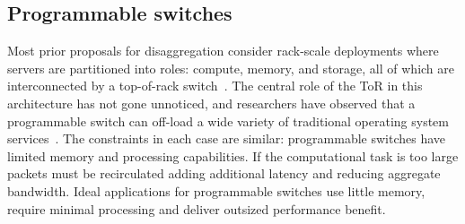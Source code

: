 







\subsection{Programmable switches}



Most prior proposals for
disaggregation consider rack-scale deployments where
servers are partitioned into roles: compute, memory, and storage, all
of which are interconnected by a top-of-rack
switch~\cite{disandapp,the-machine,intel-rack,firebox,legoos}.  The central
role of the ToR in this architecture has not gone unnoticed, and
researchers have observed that a programmable switch can off-load a
wide variety of traditional operating system
services~\cite{disandapp,mind,netlock,netkv,netchain,netcache}. The
constraints in each case are similar: programmable switches have
limited memory and processing capabilities.  If the computational task
is too large packets must be recirculated adding
additional latency and reducing aggregate bandwidth.  Ideal
applications for programmable switches use little memory, require
minimal processing and deliver outsized performance benefit.

